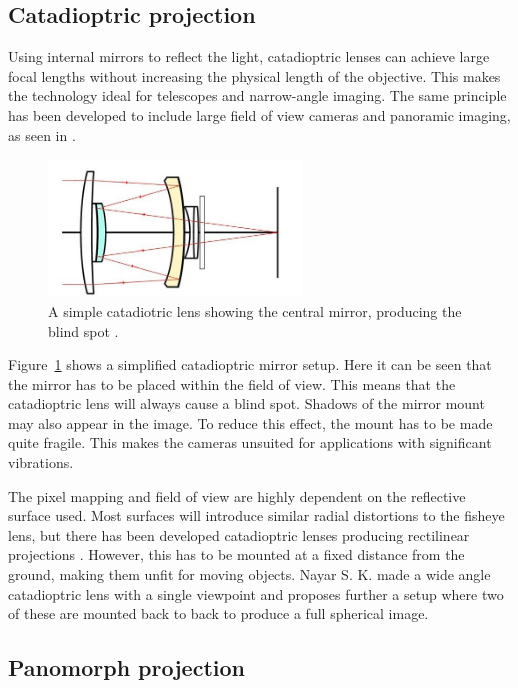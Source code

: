 \subsection{Catadioptric projection}

Using internal mirrors to reflect the light, catadioptric lenses can achieve large focal lengths without increasing the physical length of the objective. This makes the technology ideal for telescopes and narrow-angle imaging. The same principle has been developed to include large field of view cameras and panoramic imaging, as seen in \cite{CatadioptricOmni}. 

\begin{figure}[!htb]
    \centering
    \includegraphics[width=0.6\textwidth]{rapport/fig/Theory/cata.jpeg}
    \caption{A simple catadiotric lens showing the central mirror, producing the blind spot \cite{CataImage}.}
    \label{fig:theory_catadioptric_lens}
\end{figure}

Figure~\ref{fig:theory_catadioptric_lens} shows a simplified catadioptric mirror setup. Here it can be seen that the mirror has to be placed within the field of view. This means that the catadioptric lens will always cause a blind spot. Shadows of the mirror mount may also appear in the image. To reduce this effect, the mount has to be made quite fragile. This makes the cameras unsuited for applications with significant vibrations.

The pixel mapping and field of view are highly dependent on the reflective surface used. Most surfaces will introduce similar radial distortions to the fisheye lens, but there has been developed catadioptric lenses producing rectilinear projections \cite{RectilinearCatadioptric}. However, this has to be mounted at a fixed distance from the ground, making them unfit for moving objects. Nayar S. K. made a wide angle catadioptric lens \cite{CatadioptricOmni} with a single viewpoint and proposes further a setup where two of these are mounted back to back to produce a full spherical image.

\subsection{Panomorph projection}


